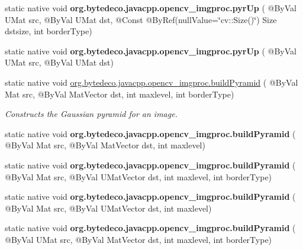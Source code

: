 \begin{DoxyCompactItemize}
\item 
\mbox{\label{group__imgproc__filter_ga03cf4a3c424de015336497afb357f094}} 
static native void {\bfseries org.\+bytedeco.\+javacpp.\+opencv\+\_\+imgproc.\+pyr\+Up} ( @By\+Val U\+Mat src, @By\+Val U\+Mat dst, @Const @By\+Ref(null\+Value=\char`\"{}cv\+::\+Size()\char`\"{}) Size dstsize, int border\+Type)
\item 
\mbox{\label{group__imgproc__filter_ga2ef5bddb838547a49fedab3518de3da3}} 
static native void {\bfseries org.\+bytedeco.\+javacpp.\+opencv\+\_\+imgproc.\+pyr\+Up} ( @By\+Val U\+Mat src, @By\+Val U\+Mat dst)
\item 
static native void \hyperlink{group__imgproc__filter_ga418b215211fecb0c256c9db02d80dd0e}{org.\+bytedeco.\+javacpp.\+opencv\+\_\+imgproc.\+build\+Pyramid} ( @By\+Val Mat src, @By\+Val Mat\+Vector dst, int maxlevel, int border\+Type)
\begin{DoxyCompactList}\small\item\em Constructs the Gaussian pyramid for an image. \end{DoxyCompactList}\item 
\mbox{\label{group__imgproc__filter_ga17e294004abf5bf35e6ba1e8932d4068}} 
static native void {\bfseries org.\+bytedeco.\+javacpp.\+opencv\+\_\+imgproc.\+build\+Pyramid} ( @By\+Val Mat src, @By\+Val Mat\+Vector dst, int maxlevel)
\item 
\mbox{\label{group__imgproc__filter_ga06bef881b57f22d92ba76260f6726637}} 
static native void {\bfseries org.\+bytedeco.\+javacpp.\+opencv\+\_\+imgproc.\+build\+Pyramid} ( @By\+Val Mat src, @By\+Val U\+Mat\+Vector dst, int maxlevel, int border\+Type)
\item 
\mbox{\label{group__imgproc__filter_ga5bcefcff889f50651f9009cc9c277fea}} 
static native void {\bfseries org.\+bytedeco.\+javacpp.\+opencv\+\_\+imgproc.\+build\+Pyramid} ( @By\+Val Mat src, @By\+Val U\+Mat\+Vector dst, int maxlevel)
\item 
\mbox{\label{group__imgproc__filter_ga23df81c790fcf208aaf8100c12e982e4}} 
static native void {\bfseries org.\+bytedeco.\+javacpp.\+opencv\+\_\+imgproc.\+build\+Pyramid} ( @By\+Val U\+Mat src, @By\+Val Mat\+Vector dst, int maxlevel, int border\+Type)

\end{DoxyCompactItemize}

